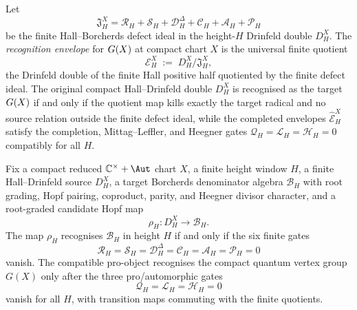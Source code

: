 \begin{definition}
\label{def:bulk-recognition-envelope}
Let
\[
 \mathfrak J_{H}^{X}
 =
 \mathcal R_{H}+\mathcal S_{H}+\mathcal D^{\Delta}_{H}
 +\mathcal C_{H}+\mathcal A_{H}+\mathcal P_{H}
\]
be the finite Hall--Borcherds defect ideal in the height-$H$ Drinfeld
double $D_{H}^{X}$. The \emph{recognition envelope} for $G(X)$ at
compact chart $X$ is the universal finite quotient
\[
 \mathcal E_{H}^{X}
 \;:=\; D_{H}^{X} \big/ \mathfrak J_{H}^{X},
\]
the Drinfeld double of the finite Hall positive half quotiented by
the finite defect ideal. The original compact Hall--Drinfeld double
$D_{H}^{X}$ is recognised as the target $G(X)$ if and only if
the quotient map kills exactly the target radical and no source
relation outside the finite defect ideal, while the completed envelopes
$\widehat{\mathcal E}_{H}^{X}$ satisfy the completion,
Mittag--Leffler, and Heegner gates
$\mathcal Q_{H}=\mathcal L_{H}=\mathcal H_{H}=0$ compatibly for all
$H$.
\end{definition}

\begin{theorem}
\label{thm:bulk-nine-gate-recognition}
Fix a compact reduced $\mathbb C^\times+\Aut$ chart \(X\), a finite
height window \(H\), a finite Hall--Drinfeld source \(D_H^X\), a target
Borcherds denominator algebra \(\mathscr B_H\) with root grading, Hopf
pairing, coproduct, parity, and Heegner divisor character, and a
root-graded candidate Hopf map
\[
 \rho_H\colon D_H^X\longrightarrow \mathscr B_H .
\]
The map \(\rho_H\) recognises \(\mathscr B_H\) in height \(H\) if and
only if the six finite gates
\[
\mathcal R_H=\mathcal S_H=\mathcal D^\Delta_H=\mathcal C_H
=\mathcal A_H=\mathcal P_H=0
\]
vanish. The compatible pro-object recognises the compact quantum vertex
group \(G(X)\) only after the three pro/automorphic gates
\[
\mathcal Q_H=\mathcal L_H=\mathcal H_H=0
\]
vanish for all \(H\), with transition maps commuting with the finite
quotients.
\end{theorem}

